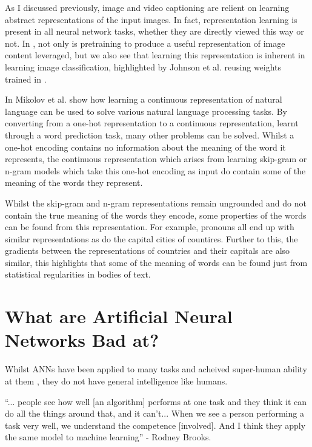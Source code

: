 As I discussed previously, image and video captioning are relient on learning abstract representations of the input images. In fact, representation learning is present in all neural network tasks, whether they are directly viewed this way or not. In \cite{vinyals2015show, venugopalan2014translating, johnson2016densecap}, not only is pretraining to produce a useful representation of image content leveraged, but we also see that learning this representation is inherent in learning image classification, highlighted by Johnson et al. \cite{johnson2016densecap} reusing weights trained in \cite{simonyan2014very}. 

In \cite{mikolov2013distributed, mikolov2013efficient, mikolov2013linguistic} Mikolov et al. show how learning a continuous representation of natural language can be used to solve various natural language processing tasks. By converting from a one-hot representation to a continuous representation, learnt through a word prediction task, many other problems can be solved. 
Whilst a one-hot encoding contains no information about the meaning of the word it represents, the continuous representation which arises from learning skip-gram or n-gram models which take this one-hot encoding as input do contain some of the meaning of the words they represent.

Whilst the skip-gram and n-gram representations remain ungrounded and do not contain the true meaning of the words they encode, some properties of the words can be found from this representation. For example, pronouns all end up with similar representations as do the capital cities of countires. Further to this, the gradients between the representations of countries and their capitals are also similar, this highlights that some of the meaning of words can be found just from statistical regularities in bodies of text.



\section{What are Artificial Neural Networks Bad at?}
Whilst ANNs have been applied to many tasks and acheived super-human ability at them \cite{vinyals2019alphastar}, they do not have general intelligence like humans.

\begin{displayquote}
``... people see how well [an algorithm] performs at one task and they think it can do all the things around that, and it can’t... When we see a person performing a task very well, we understand the competence [involved]. And I think they apply the same model to machine learning'' - Rodney Brooks.
\end{displayquote}


